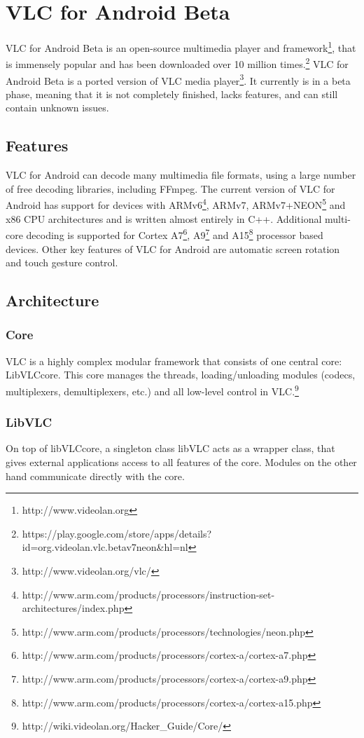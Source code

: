 \section{VLC for Android Beta}
VLC for Android Beta is an open-source multimedia player and framework\footnote{http://www.videolan.org}, that is immensely popular and has been downloaded over 10 million times.\footnote{https://play.google.com/store/apps/details?id=org.videolan.vlc.betav7neon\&hl=nl} VLC for Android Beta is a ported version of VLC media player\footnote{http://www.videolan.org/vlc/}. It currently is in a beta phase, meaning that it is not completely finished, lacks features, and can still contain unknown issues.
\subsection{Features}
VLC for Android can decode many multimedia file formats, using a large number of free decoding libraries, including FFmpeg. The current version of VLC for Android has support for devices with ARMv6\footnote{http://www.arm.com/products/processors/instruction-set-architectures/index.php}, ARMv7, ARMv7+NEON\footnote{http://www.arm.com/products/processors/technologies/neon.php} and x86 CPU architectures and is written almost entirely in C++. Additional multi-core decoding is supported for Cortex A7\footnote{http://www.arm.com/products/processors/cortex-a/cortex-a7.php}, A9\footnote{http://www.arm.com/products/processors/cortex-a/cortex-a9.php} and A15\footnote{http://www.arm.com/products/processors/cortex-a/cortex-a15.php} processor based devices. Other key features of VLC for Android are automatic screen rotation and touch gesture control.
\subsection{Architecture}
\subsubsection{Core}
VLC is a highly complex modular framework that consists of one central core: LibVLCcore. This core manages the threads, loading/unloading modules (codecs, multiplexers, demultiplexers, etc.) and all low-level control in VLC.\footnote{http://wiki.videolan.org/Hacker\_Guide/Core/}
\subsubsection{LibVLC}
On top of libVLCcore, a singleton class libVLC acts as a wrapper class, that gives external applications access to all features of the core. Modules on the other hand communicate directly with the core.
